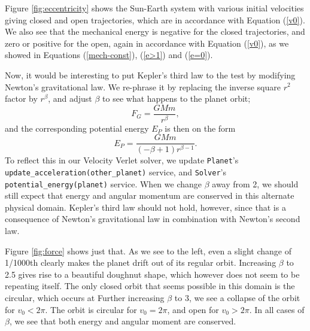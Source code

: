 \documentclass[]{article}
\begin{document}
Figure \ref{fig:eccentricity} shows the Sun-Earth system with various initial velocities giving closed and open trajectories, which are in accordance with Equation (\ref{v0}). We also see that the mechanical energy is negative for the closed trajectories, and zero or positive for the open, again in accordance with Equation (\ref{v0}), as we showed in Equations (\ref{mech-const}), (\ref{e>1}) and (\ref{e=0}).

Now, it would be interesting to put Kepler's third law to the test by modifying Newton's gravitational law. We re-phrase it by replacing the inverse square $r^2$ factor by $r^{\beta}$, and adjust $\beta$ to see what happens to the planet orbit;
\begin{equation}
	F_G = \frac{GMm}{r^{\beta}},
\end{equation}
and the corresponding potential energy $E_P$ is then on the form
\begin{equation} \label{newton-grav-alt}
	E_P = \frac{GMm}{(-\beta+1)r^{\beta-1}}.
\end{equation}
To reflect this in our Velocity Verlet solver, we update \lstinline|Planet|'s \lstinline|update_acceleration(other_planet)| service, and \lstinline|Solver|'s \lstinline|potential_energy(planet)| service. When we change $\beta$ away from 2, we should still expect that energy and angular momentum are conserved in this alternate physical domain. Kepler's third law should not hold, however, since that is a consequence of Newton's gravitational law in combination with Newton's second law. 

Figure \ref{fig:force} shows just that. As we see to the left, even a slight change of 1/1000th clearly makes the planet drift out of its regular orbit. Increasing $\beta$ to 2.5 gives rise to a beautiful doughnut shape, which however does not seem to be repeating itself. The only closed orbit that seems possible in this domain is the circular, which occurs at Further increasing $\beta$ to 3, we see a collapse of the orbit for $v_0 < 2\pi$. The orbit is circular for $v_0 = 2\pi$, and open for $v_0 > 2\pi$. In all cases of $\beta$, we see that both energy and angular moment are conserved.
\end{document}
